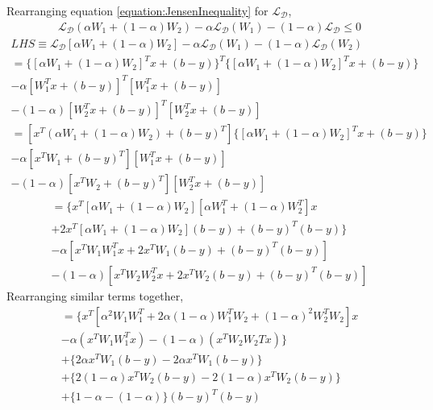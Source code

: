 \documentclass[a4paper,12pt]{article}
\begin{document}
Rearranging equation \ref{equation:JensenInequality} for $\mathcal{L_D}$,
\begin{align}
	\label{equation:Convexivity_ModifiedJensen} \mathcal{L_D}(\alpha W_1 + (1 - \alpha) W_2) - \alpha \mathcal{L_D}(W_1) 
    	- (1 - \alpha) \mathcal{L_D} \leq 0
\end{align}
\begin{multline}
	LHS \equiv \mathcal{L_D}[\alpha W_1 + (1 - \alpha) W_2 ] - 
    	\alpha \mathcal{L_D}(W_1) - (1 - \alpha) \mathcal{L_D}(W_2) \\
        = \{[\alpha W_1 + (1 - \alpha) W_2]^{T} x + (b - y)\}^{T} 
    	\{[\alpha W_1 + (1 - \alpha) W_2]^{T} x + (b - y)\} \\ 
        - \alpha [W_1^{T} x + (b - y)]^{T} [W_1^{T} x + (b - y)] \\
        - (1 -\alpha) [W_2^{T} x + (b - y)]^{T} [W_2^{T} x + (b - y)]
\end{multline}
\begin{multline}
    = [ x^{T} (\alpha W_1 + (1 - \alpha) W_2) + (b -y )^{T}]
    	\{[\alpha W_1 + (1 - \alpha) W_2]^{T} x + (b - y)\} \\
        - \alpha [x^{T} W_1 + (b - y)^{T}] [W_1^{T} x + (b - y)] \\
        - (1 -\alpha) [x^{T} W_2 + (b - y)^{T}] [W_2^{T} x + (b - y)]
\end{multline}
\begin{multline}
    = \{ x^{T} [\alpha W_1 + (1 - \alpha) W_2] [\alpha W_1^{T} + (1 - \alpha) W_2^{T}] x \\
    	+ 2 x^{T} [\alpha W_1 + (1 - \alpha) W_2] (b - y)  + (b - y)^{T} (b - y) \} \\
        - \alpha [ x^{T} W_1 W_1^{T} x + 2 x^{T} W_1 (b - y) + (b - y)^{T} (b - y)] \\
        - (1 - \alpha) [ x^{T} W_2 W_2^{T} x + 2 x^{T} W_2 (b - y) + (b - y)^{T} (b - y)] 
\end{multline}
Rearranging similar terms together,
\begin{multline}
	= \{ x^{T} \left[ \alpha^2 W_1 W_1^{T} + 2 \alpha (1 - \alpha) W_1^{T} W_2
    	+ (1 - \alpha)^2 W_2^{T} W_2 \right] x \\ 
        - \alpha (x^{T} W_1 W_1^{T} x) - (1 - \alpha)(x^{T} W_2 W_2{T} x) \} \\
        + \{ 2 \alpha x^{T} W_1 (b - y) - 2 \alpha x^{T} W_1 (b - y) \} \\
        + \{ 2 (1 - \alpha) x^{T} W_2 (b - y) - 2 (1 - \alpha) x^{T} W_2 (b - y) \} \\
        + \{ 1 - \alpha - (1 - \alpha) \} (b - y)^{T} (b - y)
\end{multline}
\end{document}
